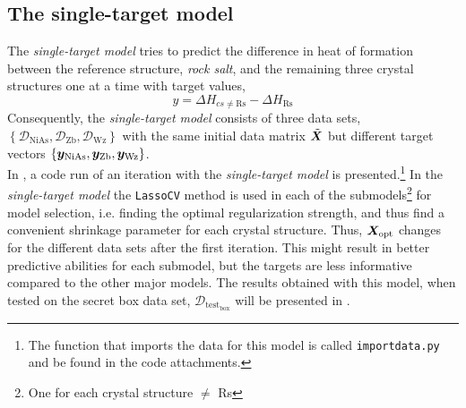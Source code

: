 \subsection{The single-target model}
The \emph{single-target model} tries to predict the difference in heat of formation between the reference structure, \emph{rock salt}, and the remaining three crystal structures one at a time with target values, 
\begin{equation}\label{eq:single_targets}
    y = \Delta H_{cs\neq \mathrm{Rs}} - \Delta H_{\mathrm{Rs}}
\end{equation}
Consequently, the \emph{single-target model} consists of three data sets, $\left\{\mathcal{D}_{\mathrm{NiAs}},\mathcal{D}_{\mathrm{Zb}},\mathcal{D}_{\mathrm{Wz}}\right\}$ with the same initial data matrix $\tilde{\bm{X}}$ but different target vectors $\left\{\bm{y}_{\mathrm{NiAs}},\bm{y}_{\mathrm{Zb}},\bm{y}_{\mathrm{Wz}}\right\}$. \\ 
In , a code run of an iteration with the \emph{single-target model} is presented.\footnote{The function that imports the data for this model is called \texttt{importdata.py} and be found in the code attachments.} In the \emph{single-target model} the \texttt{LassoCV} method is used in each of the submodels\footnote{One for each crystal structure $\neq$ Rs} for model selection, i.e. finding the optimal regularization strength, and thus find a convenient shrinkage parameter for each crystal structure. Thus, $\bm{X}_{\mathrm{opt}}$ changes for the different data sets after the first iteration. This might result in better predictive abilities for each submodel, but the targets are less informative compared to the other major models. The results obtained with this model, when tested on the secret box data set, $\mathcal{D}_{\mathrm{test_{box}}}$ will be presented in . 



